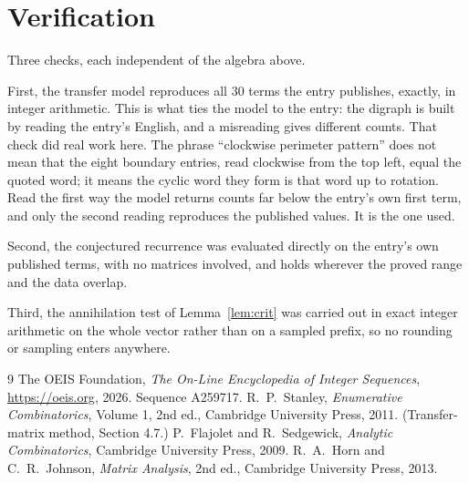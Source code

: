 \documentclass[11pt,a4paper]{article}
\theoremstyle{plain}
\theoremstyle{definition}
\begin{document}
\section{Verification}

Three checks, each independent of the algebra above.

First, the transfer model reproduces all $30$ terms the entry publishes, exactly, in
integer arithmetic. This is what ties the model to the entry: the digraph is built by reading
the entry's English, and a misreading gives different counts. That check did real work here. The phrase ``clockwise perimeter pattern'' does not mean that the eight boundary entries, read clockwise from the top left, equal the quoted word; it means the cyclic word they form is that word up to rotation. Read the first way the model returns counts far below the entry's own first term, and only the second reading reproduces the published values. It is the one used.

Second, the conjectured recurrence was evaluated directly on the entry's own published terms,
with no matrices involved, and holds wherever the proved range and the data overlap.

Third, the annihilation test of Lemma~\ref{lem:crit} was carried out in exact integer
arithmetic on the whole vector rather than on a sampled prefix, so no rounding or sampling
enters anywhere.

\begin{thebibliography}{9}
 The OEIS Foundation, \emph{The On-Line Encyclopedia of Integer
Sequences}, \url{https://oeis.org}, 2026. Sequence A259717.
 R.~P.~Stanley, \emph{Enumerative Combinatorics}, Volume 1, 2nd ed.,
Cambridge University Press, 2011. (Transfer-matrix method, Section 4.7.)
 P.~Flajolet and R.~Sedgewick, \emph{Analytic Combinatorics}, Cambridge
University Press, 2009.
 R.~A.~Horn and C.~R.~Johnson, \emph{Matrix Analysis}, 2nd ed., Cambridge
University Press, 2013.
\end{thebibliography}
\end{document}

